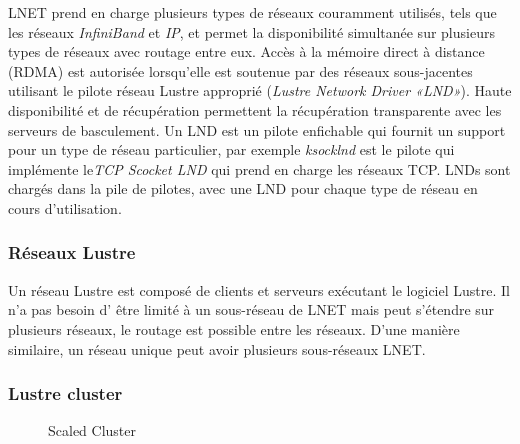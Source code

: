 \documentclass[12pt]{article}
\begin{document}
LNET prend en charge plusieurs types de réseaux couramment utilisés, tels que les réseaux \textit{InfiniBand} et \textit{IP}, et permet la disponibilité simultanée sur plusieurs types de réseaux avec routage entre eux. Accès à la mémoire direct à distance (RDMA) est autorisée lorsqu'elle est soutenue par des réseaux sous-jacentes utilisant le pilote réseau Lustre approprié (\textit{Lustre Network Driver «LND»}). Haute disponibilité et de récupération permettent la récupération transparente avec les serveurs de basculement. 
Un LND est un pilote enfichable qui fournit un support pour un type de réseau particulier, par exemple \textit{ksocklnd} est le pilote qui implémente le\textit{TCP Scocket LND} qui prend en charge les réseaux TCP. LNDs sont chargés dans la pile de pilotes, avec une LND pour chaque type de réseau en cours d'utilisation.

\subsubsection{Réseaux Lustre}

Un réseau Lustre est composé de clients et serveurs exécutant le logiciel Lustre. Il n'a pas besoin d' être limité à un sous-réseau de LNET mais peut s'étendre sur plusieurs réseaux, le routage est possible entre les réseaux. D'une manière similaire, un réseau unique peut avoir plusieurs sous-réseaux LNET.

\subsubsection{Lustre cluster}


\begin{figure}[Cluster]
\caption{Scaled Cluster}
\label{scaled_cluster}
\end{figure}
\end{document}
